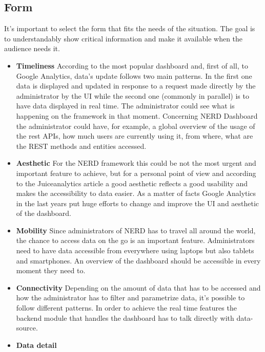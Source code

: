 \documentclass[a4paper,13pt]{report}
\begin{document}
\subsection{Form}
It's important to select the form that fits the needs of the situation.
The goal is to understandably show critical information and make it available when the audience needs it.
\begin{itemize}
\item  \textbf{Timeliness}\newline
According to the most popular dashboard and, first of all, to Google Analytics, data's update follows two main patterns. In the first one data  is displayed and updated in response to a request made directly by the administrator by the UI while the second one (commonly in parallel) is to have data  displayed in real time. The administrator could see what is happening on the framework in that moment. Concerning NERD Dashboard the administrator could have, for example, a global overview of the usage of the rest APIs, how much users are currently using it, from where, what are the REST methods and entities accessed.
\item \textbf{Aesthetic}\newline
For the NERD framework this could be not the most urgent and important feature to achieve, but for a personal point of view and according to the Juiceanalytics article \cite{Juice} a good aesthetic reflects a good usability and makes the accessibility to  data easier.
As a matter of facts Google Analytics in the last years put huge efforts to change and improve the UI and aesthetic of the dashboard.
\item\textbf{Mobility}\newline
Since administrators of NERD has to travel all around the world, the chance to access data on the go is an important feature. Administrators need to have data accessible from everywhere using laptops but also tablets and smartphones. An overview of the dashboard should be accessible in every moment they need to.
\item \textbf{Connectivity}\newline
Depending on the amount of data that has to be accessed and how the administrator has to filter and parametrize data, it's possible to follow different patterns. 
In order to achieve the real time features the backend module that handles the dashboard has to talk directly with data-source.
\item \textbf{Data detail}\newline

\end{itemize}
\end{document}
